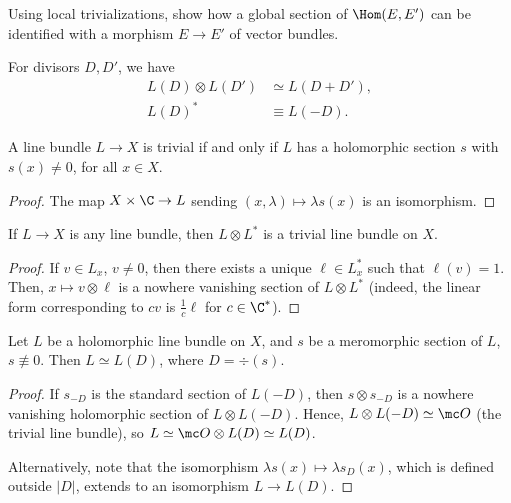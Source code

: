 \documentclass[11pt]{report}
\begin{document}
\begin{exercise}
    Using local trivializations, show how a global section of $\Hom(E,E')$ can be identified with a morphism $E \to E'$ of vector bundles.
\end{exercise}

\begin{rmk}
For divisors $D,D'$, we have
\begin{align*}
    L(D)\otimes L(D') &\simeq L(D+D'), \\ L(D)^* &\equiv L(-D).
\end{align*}
\end{rmk}

\begin{lem}
    A line bundle $L \to X$ is trivial if and only if $L$ has a holomorphic section $s$ with $s(x) \neq 0$, for all $x \in X$.
\end{lem}
\begin{proof}
    The map $X \times \C \to L$ sending $(x,\lambda)\mapsto \lambda s(x)$ is an isomorphism.
\end{proof}

\begin{cor}
If $L \to X$ is any line bundle, then $L \otimes L^*$ is a trivial line bundle on $X$. 
\end{cor}
\begin{proof}
    If $v \in L_x$, $v \neq 0$, then there exists a unique $\ell \in L_x^*$ such that $\ell(v) = 1$. Then, $x \mapsto v \otimes \ell$ is a nowhere vanishing section of $L \otimes L^*$ (indeed, the linear form corresponding to $cv$ is $\frac{1}{c}\ell$ for $c \in \C^*$).
\end{proof}

\begin{rmk} \label{rmk:line-bundle-comes-from-divisor}
    Let $L$ be a holomorphic line bundle on $X$, and $s$ be a meromorphic section of $L$, $s \not \equiv 0$. Then $L \simeq L(D)$, where $D = \div(s)$.
\end{rmk}

\begin{proof}
    If $s_{-D}$ is the standard section of $L(-D)$, then $s \otimes s_{-D}$ is a nowhere vanishing holomorphic section of $L \otimes L(-D)$. Hence, $L \otimes L(-D)\simeq \mc O$ (the trivial line bundle), so $L \simeq \mc O \otimes L(D) \simeq L(D)$.

    Alternatively, note that the isomorphism $\lambda s(x) \mapsto \lambda s_D(x)$, which is defined outside $|D|$, extends to an isomorphism $L \to L(D)$.
\end{proof}
\end{document}
